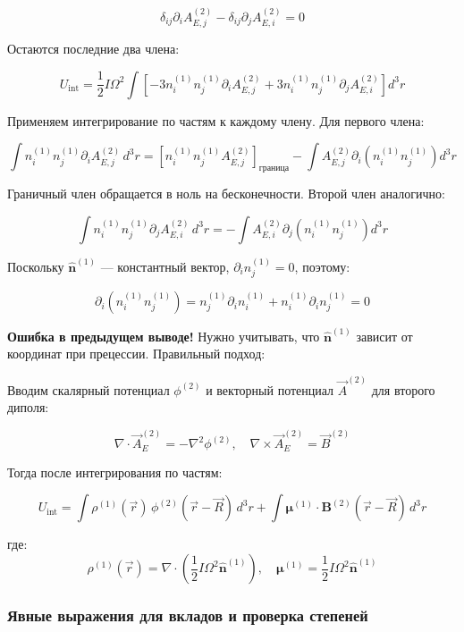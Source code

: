 \documentclass[12pt]{article}
\begin{document}
\[
\delta_{ij} \partial_i A_{E,j}^{(2)} - \delta_{ij} \partial_j A_{E,i}^{(2)} = 0
\]

Остаются последние два члена:

\[
U_{\text{int}} = \frac{1}{2} I \Omega^2 \int \left[ -3 n_i^{(1)} n_j^{(1)} \partial_i A_{E,j}^{(2)} + 3 n_i^{(1)} n_j^{(1)} \partial_j A_{E,i}^{(2)} \right] d^3r
\]

Применяем интегрирование по частям к каждому члену. Для первого члена:

\[
\int n_i^{(1)} n_j^{(1)} \partial_i A_{E,j}^{(2)} \, d^3r = \left[ n_i^{(1)} n_j^{(1)} A_{E,j}^{(2)} \right]_{\text{граница}} - \int A_{E,j}^{(2)} \partial_i \left( n_i^{(1)} n_j^{(1)} \right) d^3r
\]

Граничный член обращается в ноль на бесконечности. Второй член аналогично:

\[
\int n_i^{(1)} n_j^{(1)} \partial_j A_{E,i}^{(2)} \, d^3r = - \int A_{E,i}^{(2)} \partial_j \left( n_i^{(1)} n_j^{(1)} \right) d^3r
\]

Поскольку $\hat{\boldsymbol{n}}^{(1)}$ — константный вектор, $\partial_i n_j^{(1)} = 0$, поэтому:

\[
\partial_i \left( n_i^{(1)} n_j^{(1)} \right) = n_j^{(1)} \partial_i n_i^{(1)} + n_i^{(1)} \partial_i n_j^{(1)} = 0
\]

\textbf{Ошибка в предыдущем выводе!} Нужно учитывать, что $\hat{\boldsymbol{n}}^{(1)}$ зависит от координат при прецессии. Правильный подход:

Вводим скалярный потенциал $\phi^{(2)}$ и векторный потенциал $\vec{A}^{(2)}$ для второго диполя:

\[
\nabla \cdot \vec{A}_E^{(2)} = -\nabla^2 \phi^{(2)}, \quad \nabla \times \vec{A}_E^{(2)} = \vec{B}^{(2)}
\]

Тогда после интегрирования по частям:

\[
U_{\text{int}} = \int \rho^{(1)}(\vec{r}) \, \phi^{(2)}(\vec{r} - \vec{R}) \, d^3r + \int \boldsymbol{\mu}^{(1)} \cdot \boldsymbol{B}^{(2)}(\vec{r} - \vec{R}) \, d^3r
\]

где:
\[
\rho^{(1)}(\vec{r}) = \nabla \cdot \left( \frac{1}{2} I \Omega^2 \hat{\boldsymbol{n}}^{(1)} \right), \quad \boldsymbol{\mu}^{(1)} = \frac{1}{2} I \Omega^2 \hat{\boldsymbol{n}}^{(1)}
\]

\subsubsection{Явные выражения для вкладов и проверка степеней}
\end{document}
